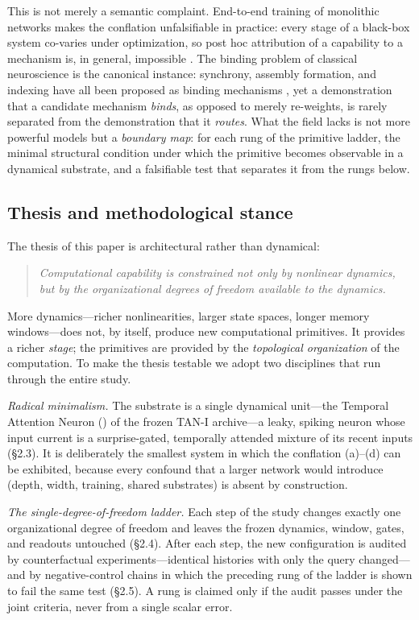 This is not merely a semantic complaint. End-to-end training of monolithic
networks makes the conflation unfalsifiable in practice: every stage of a
black-box system co-varies under optimization, so post hoc attribution of a
capability to a mechanism is, in general, impossible \citep{fodor1988,
lake2017,lake2018}. The binding problem of classical neuroscience is the
canonical instance: synchrony, assembly formation, and indexing have all been
proposed as binding mechanisms \citep{von1995,singer1999}, yet a demonstration
that a candidate mechanism \emph{binds}, as opposed to merely re-weights, is
rarely separated from the demonstration that it \emph{routes}. What the field
lacks is not more powerful models but a \emph{boundary map}: for each rung of
the primitive ladder, the minimal structural condition under which the
primitive becomes observable in a dynamical substrate, and a falsifiable test
that separates it from the rungs below.

\subsection{Thesis and methodological stance}
\label{sec:stance}

The thesis of this paper is architectural rather than dynamical:

\begin{quote}
\emph{Computational capability is constrained not only by nonlinear
dynamics, but by the organizational degrees of freedom available to the
dynamics.}
\end{quote}

More dynamics---richer nonlinearities, larger state spaces, longer memory
windows---does not, by itself, produce new computational primitives. It
provides a richer \emph{stage}; the primitives are provided by the
\emph{topological organization} of the computation. To make the thesis
testable we adopt two disciplines that run through the entire study.

\emph{Radical minimalism.} The substrate is a single dynamical unit---the
Temporal Attention Neuron (\TAN) of the frozen TAN-I archive---a leaky,
spiking neuron whose input current is a surprise-gated, temporally attended
mixture of its recent inputs (§2.3). It is deliberately the smallest system
in which the conflation (a)--(d) can be exhibited, because every confound
that a larger network would introduce (depth, width, training, shared
substrates) is absent by construction.

\emph{The single-degree-of-freedom ladder.} Each step of the study changes
exactly one organizational degree of freedom and leaves the frozen dynamics,
window, gates, and readouts untouched (§2.4). After each step, the new
configuration is audited by counterfactual experiments---identical histories
with only the query changed---and by negative-control chains in which the
preceding rung of the ladder is shown to fail the same test (§2.5). A rung is
claimed only if the audit passes under the joint criteria, never from a
single scalar error.

